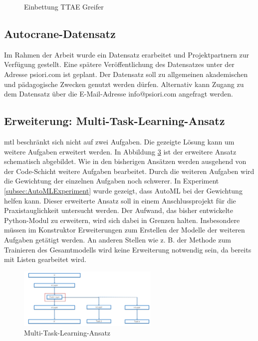 \begin{figure}[h]
\begin{subfigure}[c]{0.6\textwidth}
 			\label{img:TTGrappleEinbettungVorhersage}	
 		\end{subfigure}
 		\caption{Einbettung TTAE Greifer}
 		\label{img:TTGrappleEmb}
 	\end{figure}
 	
	\subsection{Autocrane-Datensatz}
	\label{subsec:AutocraneDatensatz}	
	Im Rahmen der Arbeit wurde ein Datensatz erarbeitet und Projektpartnern zur Verfügung gestellt. Eine spätere Veröffentlichung des Datensatzes unter der Adresse psiori.com ist geplant. Der Datensatz soll zu allgemeinen akademischen und pädagogische Zwecken genutzt werden dürfen. Alternativ kann Zugang zu dem Datensatz über die E-Mail-Adresse info@psiori.com angefragt werden.

	\subsection{Erweiterung: Multi-Task-Learning-Ansatz}
	\label{subsec:MehrfacheAufgaben}
	\acl{mtl} beschränkt sich nicht auf zwei Aufgaben. Die gezeigte Lösung kann um weitere Aufgaben erweitert werden. In Abbildung \ref{img:AusblickMultiTaskAnsatz} ist der erweitere Ansatz schematisch abgebildet. Wie in den bisherigen Ansätzen werden ausgehend von der Code-Schicht weitere Aufgaben bearbeitet. Durch die weiteren Aufgaben wird die Gewichtung der einzelnen Aufgaben noch schwerer. In Experiment \ref{subsec:AutoMLExperiment}  wurde gezeigt, dass AutoML bei der Gewichtung helfen kann. Dieser erweiterte Ansatz soll in einem Anschlussprojekt für die Praxistauglichkeit untersucht werden. Der Aufwand, das bisher entwickelte Python-Modul zu erweitern, wird sich dabei in Grenzen halten. Insbesondere müssen im Konstruktor Erweiterungen zum Erstellen der Modelle der weiteren Aufgaben getätigt werden. An anderen Stellen wie z. B. der Methode zum Trainieren des Gesamtmodells wird keine Erweiterung notwendig sein, da bereits mit Listen gearbeitet wird.
	\begin{figure}[h]
		\centering
		\includegraphics[width=0.6\textwidth, center]{bilder/FazitUndAusblick/MultiTaskAnsatz.PNG}
		\caption{Multi-Task-Learning-Ansatz}
		\label{img:AusblickMultiTaskAnsatz}
	\end{figure}

